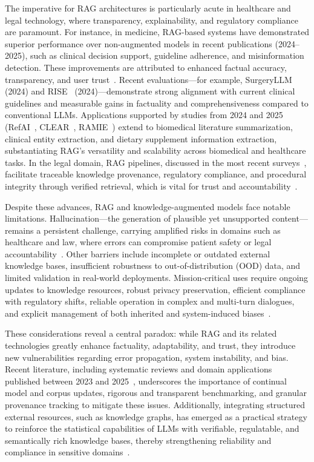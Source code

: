 \documentclass[sigconf]{acmart}
\begin{document}
The imperative for RAG architectures is particularly acute in healthcare and legal technology, where transparency, explainability, and regulatory compliance are paramount. For instance, in medicine, RAG-based systems have demonstrated superior performance over non-augmented models in recent publications (2024--2025), such as clinical decision support, guideline adherence, and misinformation detection. These improvements are attributed to enhanced factual accuracy, transparency, and user trust~\cite{ref1,ref2,ref3,ref4,ref5,ref6,ref7,ref8,ref29,ref31,ref42,ref48,ref51,ref52,ref54,ref55,ref63}. Recent evaluations---for example, SurgeryLLM~\cite{ref1} (2024) and RISE~\cite{ref55} (2024)---demonstrate strong alignment with current clinical guidelines and measurable gains in factuality and comprehensiveness compared to conventional LLMs. Applications supported by studies from 2024 and 2025 (RefAI~\cite{ref6}, CLEAR~\cite{ref3}, RAMIE~\cite{ref7}) extend to biomedical literature summarization, clinical entity extraction, and dietary supplement information extraction, substantiating RAG’s versatility and scalability across biomedical and healthcare tasks. In the legal domain, RAG pipelines, discussed in the most recent surveys~\cite{ref8,ref63}, facilitate traceable knowledge provenance, regulatory compliance, and procedural integrity through verified retrieval, which is vital for trust and accountability~\cite{ref4,ref5,ref8,ref10,ref14,ref16,ref63}.

Despite these advances, RAG and knowledge-augmented models face notable limitations. Hallucination---the generation of plausible yet unsupported content---remains a persistent challenge, carrying amplified risks in domains such as healthcare and law, where errors can compromise patient safety or legal accountability~\cite{ref15,ref38,ref45,ref46,ref47,ref50,ref52,ref54,ref55,ref64}. Other barriers include incomplete or outdated external knowledge bases, insufficient robustness to out-of-distribution (OOD) data, and limited validation in real-world deployments. Mission-critical uses require ongoing updates to knowledge resources, robust privacy preservation, efficient compliance with regulatory shifts, reliable operation in complex and multi-turn dialogues, and explicit management of both inherited and system-induced biases~\cite{ref15,ref38,ref45,ref46,ref47,ref50,ref52,ref54,ref55,ref64}.

These considerations reveal a central paradox: while RAG and its related technologies greatly enhance factuality, adaptability, and trust, they introduce new vulnerabilities regarding error propagation, system instability, and bias. Recent literature, including systematic reviews and domain applications published between 2023 and 2025~\cite{ref15,ref52,ref54,ref55}, underscores the importance of continual model and corpus updates, rigorous and transparent benchmarking, and granular provenance tracking to mitigate these issues. Additionally, integrating structured external resources, such as knowledge graphs, has emerged as a practical strategy to reinforce the statistical capabilities of LLMs with verifiable, regulatable, and semantically rich knowledge bases, thereby strengthening reliability and compliance in sensitive domains~\cite{ref16,ref29,ref47,ref48}.
\end{document}
